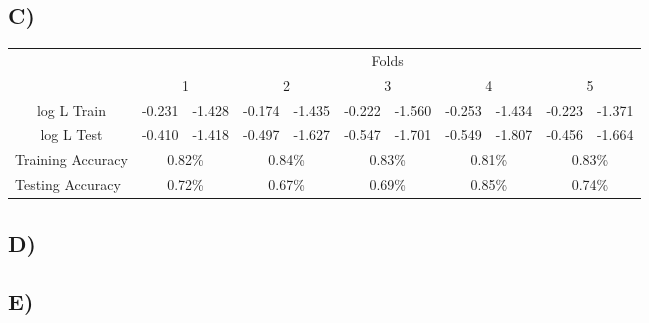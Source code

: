\documentclass{report}
\begin{document}
\subsection*{C)}
\begin{center}
\begin{table}[h]
 \begin{tabular}{l|l|l|l|l|l|l|l|l|l|l|}
 \cline{2-11}
     & \multicolumn{10}{c|}{Folds}      \\ \cline{2-11}
     & \multicolumn{2}{c|}{1} & \multicolumn{2}{c|}{2} & \multicolumn{2}{c|}{3} & \multicolumn{2}{c|}{4} & \multicolumn{2}{c|}{5} \\ \hline
\multicolumn{1}{|c|}{log L Train} & -0.231 & -1.428 & -0.174 & -1.435 & -0.222 & -1.560 & -0.253 & -1.434 & -0.223 & -1.371 \\ \hline
\multicolumn{1}{|c|}{log L Test} & -0.410 & -1.418 & -0.497 & -1.627 & -0.547 & -1.701 & -0.549 & -1.807 & -0.456 & -1.664 \\ \hline
\multicolumn{1}{|l|}{Training Accuracy} & \multicolumn{2}{c|}{0.82\%} & \multicolumn{2}{c|}{0.84\%} & \multicolumn{2}{c|}{0.83\%} & \multicolumn{2}{c|}{0.81\%} & \multicolumn{2}{c|}{0.83\%} \\ \hline
\multicolumn{1}{|l|}{Testing Accuracy} & \multicolumn{2}{c|}{0.72\%} & \multicolumn{2}{c|}{0.67\%} & \multicolumn{2}{c|}{0.69\%} & \multicolumn{2}{c|}{0.85\%} & \multicolumn{2}{c|}{0.74\%} \\ \hline
\end{tabular}
\end{table}
\end{center}
\subsection*{D)}
\subsection*{E)}
\end{document}
